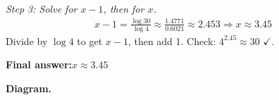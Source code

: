 \documentclass[11pt]{article}
\begin{document}
\textit{Step 3: Solve for \( x - 1 \), then for \( x \).}
\[\begin{gathered}
x - 1 = \frac{\log 30}{\log 4} \approx \frac{1.4771}{0.6021} \approx 2.453 \Rightarrow x \approx 3.45
\end{gathered}\]
Divide by \( \log 4 \) to get \( x-1 \), then add 1. Check: \( 4^{2.45} \approx 30 \) $\checkmark$.

\begin{answerbox}
\textbf{Final answer:}\quad \(\displaystyle  x \approx 3.45 \)
\end{answerbox}
\textbf{Diagram.}

\begin{center}
\end{center}
\end{document}
